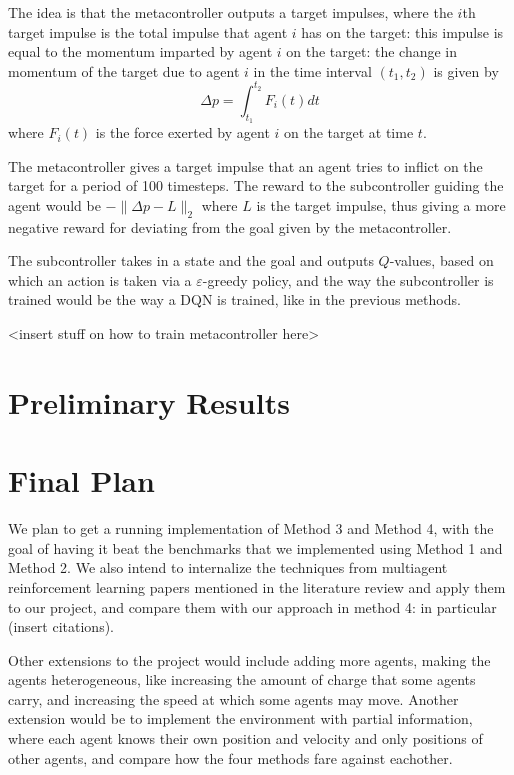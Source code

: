 \documentclass{article}
\begin{document}
The idea is that the metacontroller outputs a target
impulses, where the $i$th target impulse is the total impulse
that agent $i$ has on the target: this impulse is equal to the momentum
imparted by agent $i$ on the target: the change in momentum of the target due to
agent $i$ in the time interval $(t_1,t_2)$ is given by
\[
\Delta p = \int_{t_1}^{t_2} F_i(t)dt
\]
where $F_i(t)$ is the force exerted by agent $i$ on the target at time $t$.

The metacontroller gives a target impulse that an agent tries to inflict on the target
for a period of 100 timesteps.
The reward to the subcontroller guiding the agent would be $-\|\Delta p - L\|_2$ where
$L$ is the target impulse, thus giving a more negative reward for deviating from the
goal given by the metacontroller.

The subcontroller takes in a state and the goal and outputs $Q$-values, based on which
an action is taken via a $\varepsilon$-greedy policy, and the way the subcontroller is
trained would be the way a DQN is trained, like in the previous methods.

<insert stuff on how to train metacontroller here>

\section{Preliminary Results}

\section{Final Plan}
We plan to get a running implementation of Method 3 and Method 4, with the goal
of having it beat the benchmarks that we implemented using Method 1 and Method 2. We also intend
to internalize the techniques from multiagent reinforcement learning papers mentioned
in the literature review and apply them to our project, and compare them
with our approach in method 4: in particular (insert citations).

Other extensions to the project would include adding more agents, making the agents heterogeneous,
like increasing the amount of charge that some agents carry, and increasing the speed at which
some agents may move. Another extension would be to implement the environment with partial
information, where each agent knows their own position and velocity and only positions of other
agents, and compare how the four methods fare against eachother.



\end{document}
